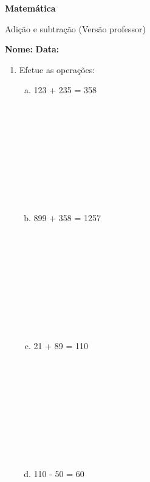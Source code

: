 \documentclass[a4paper,14pt]{article}
\begin{document}
	
	\noindent\textbf{Matemática} 
	
	\begin{center}Adição e subtração (Versão professor)
	\end{center}
	
	\noindent\textbf{Nome:} \underline{\hspace{10cm}}
	\noindent\textbf{Data:} \underline{\hspace{4cm}}
	
	
	
    \begin{multicols}{2}
		\begin{enumerate}
			\item Efetue as operações:
			\begin{enumerate}[a)]
				\item 123 + 235 = 358 \\\\\\\\\\\\\\\\\\\\
				\item 899 + 358 = 1257 \\\\\\\\\\\\\\\\\\\\
				\item 21 + 89 = 110 \\\\\\\\\\\\\\\\\\\\
				\item 110 - 50 = 60 \\\\\\\\\\\\\\\\\\\\

\end{enumerate}
\end{enumerate}
\end{multicols}
\end{document}
